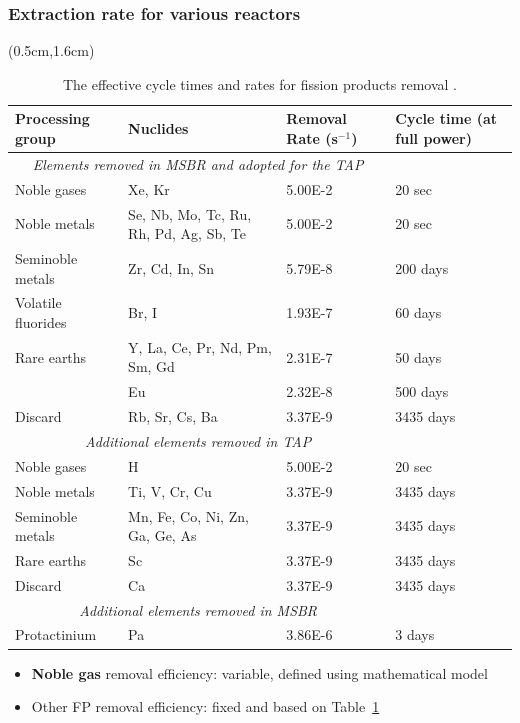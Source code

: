 \documentclass[9pt]{beamer}
\begin{document}
\begin{frame}
\frametitle{Extraction rate for various reactors}
\begin{textblock*}{12.5cm}(0.5cm,1.6cm) %
\begin{table}[htbp!]
\fontsize{6}{9}\selectfont
\centering
\caption{The effective cycle times and rates for fission products 
removal \cite{robertson_conceptual_1971, betzler_implementation_2017}.}
\vspace{-2mm}
\begin{tabular}{p{} p{} p{} 
p{}}
\hline 
\textbf{Processing group} & \qquad\qquad\qquad \textbf{Nuclides} & 
\textbf{Removal Rate (s$^{-1}$)} & \textbf{Cycle time (at full 
power)} 
\\ \hline 
\multicolumn{3}{c}{\textit{Elements removed in \gls{MSBR} and 
adopted for the \gls{TAP}} 
\cite{robertson_conceptual_1971}} \\
Noble gases & Xe, Kr								  & 5.00E-2 & 
20 
sec \\
Noble metals & Se, Nb, Mo, Tc, Ru, Rh, Pd, Ag, Sb, Te & 5.00E-2 & 
20 
sec \\
Seminoble metals & Zr, Cd, In, Sn	  				  & 5.79E-8 & 
200 
days\\
Volatile fluorides & Br, I 							  & 1.93E-7 & 
60 
days\\
Rare earths & Y, La, Ce, Pr, Nd, Pm, Sm, Gd           & 2.31E-7 & 
50 
days\\
\qquad & Eu & 2.32E-8 & 500 days \\
Discard & Rb, Sr, Cs, Ba & 3.37E-9 & 3435 days \\
\hline
\multicolumn{3}{c}{\textit{Additional elements removed in 
\gls{TAP}} 
\cite{betzler_implementation_2017, 
transatomic_power_corporation_neutronics_2016}} \\
Noble gases & H								  	& 5.00E-2 & 20 
sec    \\
Noble metals & Ti, V, Cr, Cu						& 3.37E-9 & 
3435 
days \\
Seminoble metals & Mn, Fe, Co, Ni, Zn, Ga, Ge, As   & 3.37E-9 & 
3435 
days \\
Rare earths & Sc									& 3.37E-9 & 
3435 
days \\
Discard & Ca										& 3.37E-9 & 
3435 
days \\
\hline
\multicolumn{3}{c}{\textit{Additional elements removed in 
\gls{MSBR}} 
\cite{robertson_conceptual_1971}} \\
Protactinium & Pa  	& 3.86E-6 & 3 days    \\
\hline
\end{tabular}
\label{tab:reprocessing_list}
\end{table}
\begin{itemize}
\item \textbf{Noble gas} removal efficiency: variable, defined using 
mathematical model
\item Other FP removal efficiency: fixed and based on 
Table~\ref{tab:reprocessing_list}
\end{itemize}
\end{textblock*}
\end{frame}
\end{document}
